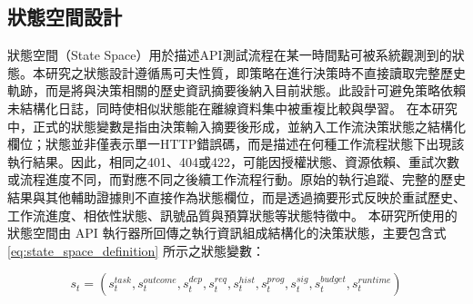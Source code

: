 \begin{ZhChapter}
\subsection{狀態空間設計}
\text 狀態空間（State Space）用於描述API測試流程在某一時間點可被系統觀測到的狀態。本研究之狀態設計遵循馬可夫性質，即策略在進行決策時不直接讀取完整歷史軌跡，而是將與決策相關的歷史資訊摘要後納入目前狀態。此設計可避免策略依賴未結構化日誌，同時使相似狀態能在離線資料集中被重複比較與學習。
\text 在本研究中，正式的狀態變數是指由決策輸入摘要後形成，並納入工作流決策狀態之結構化欄位；狀態並非僅表示單一HTTP錯誤碼，而是描述在何種工作流程狀態下出現該執行結果。因此，相同之401、404或422，可能因授權狀態、資源依賴、重試次數或流程進度不同，而對應不同之後續工作流程行動。原始的執行追蹤、完整的歷史結果與其他輔助證據則不直接作為狀態欄位，而是透過摘要形式反映於重試歷史、工作流進度、相依性狀態、訊號品質與預算狀態等狀態特徵中。
\text 本研究所使用的狀態空間由 API 執行器所回傳之執行資訊組成結構化的決策狀態，主要包含式 \eqref{eq:state_space_definition} 所示之狀態變數：

\begin{equation}
\label{eq:state_space_definition}
s_t=
\left(
s_t^{task},
s_t^{outcome},
s_t^{dep},
s_t^{req},
s_t^{hist},
s_t^{prog},
s_t^{sig},
s_t^{budget},
s_t^{runtime}
\right)
\end{equation}


\end{ZhChapter}
